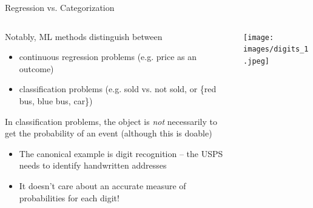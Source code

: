 \documentclass[notes,11pt, aspectratio=169]{beamer}
\newenvironment{wideitemize}{\itemize\addtolength{\itemsep}{10pt}}{\enditemize}
\begin{document}
\begin{frame}{Regression vs. Categorization}
    \begin{columns}[onlytextwidth, T] %
      \begin{column}{.5\textwidth}
  \begin{wideitemize}
  \item Notably, ML methods distinguish between
    \begin{itemize}
    \item continuous regression problems (e.g. price as an outcome)
    \item classification problems (e.g. sold vs. not sold, or \{red bus, blue bus, car\})
    \end{itemize}
  \item In classification problems, the object is \emph{not}
    necessarily to get the probability of an event (although this is doable)
    \begin{itemize}
    \item The canonical example is digit recognition -- the USPS needs
      to identify handwritten addresses
    \item It doesn't care about an accurate measure of probabilities
      for each digit!
    \end{itemize}
  \end{wideitemize}
      \end{column}%
      \hfill%
      \begin{column}{.5\textwidth}
        \texttt{[image: images/digits\_1.jpeg]}
      \end{column}%
    \end{columns}
\end{frame}
\end{document}
